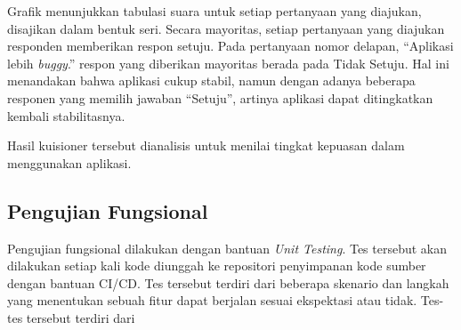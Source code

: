     Grafik menunjukkan tabulasi suara untuk setiap pertanyaan yang diajukan, disajikan dalam bentuk seri.
    Secara mayoritas, setiap pertanyaan yang diajukan responden memberikan respon setuju. Pada pertanyaan
    nomor delapan, ``Aplikasi lebih \textit{buggy}.'' respon yang diberikan mayoritas berada pada 
    Tidak Setuju. Hal ini menandakan bahwa aplikasi cukup stabil, namun dengan adanya beberapa responen 
    yang memilih jawaban ``Setuju'', artinya aplikasi dapat ditingkatkan kembali stabilitasnya.
    
    Hasil kuisioner tersebut dianalisis untuk menilai tingkat kepuasan dalam menggunakan aplikasi.

\subsection{Pengujian Fungsional}
Pengujian fungsional dilakukan dengan bantuan \textit{Unit Testing}. Tes tersebut akan dilakukan
setiap kali kode diunggah ke repositori penyimpanan kode sumber dengan bantuan CI/CD. Tes tersebut
terdiri dari beberapa skenario dan langkah yang menentukan sebuah fitur dapat berjalan sesuai ekspektasi
atau tidak. Tes-tes tersebut terdiri dari
